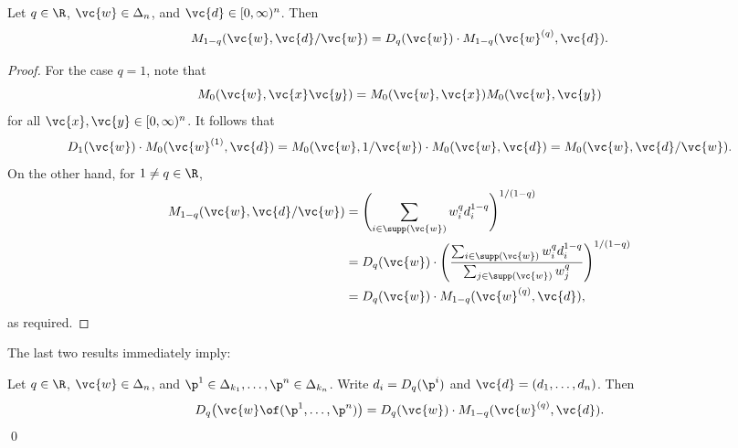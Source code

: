 \begin{lemma}
Let $q \in \R$, $\vc{w} \in \Delta_n$, and $\vc{d} \in [0, \infty)^n$.
Then
\[
M_{1 - q}(\vc{w}, \vc{d}/\vc{w})
=
D_q(\vc{w}) \cdot M_{1 - q}(\vc{w}^{(q)}, \vc{d}).
\]
\end{lemma}

\begin{proof}
For the case $q = 1$, note that
\[
M_0(\vc{w}, \vc{x}\vc{y}) =
M_0(\vc{w}, \vc{x}) M_0(\vc{w}, \vc{y})
\]
for all $\vc{x}, \vc{y} \in [0, \infty)^n$.  It follows that
\[
D_1(\vc{w}) \cdot M_0(\vc{w}^{(1)}, \vc{d})
=
M_0(\vc{w}, 1/\vc{w}) \cdot M_0(\vc{w}, \vc{d})
=
M_0(\vc{w}, \vc{d}/\vc{w}).
\]
On the other hand, for $1 \neq q \in \R$,
% 
\begin{align*}  
M_{1 - q}(\vc{w}, \vc{d}/\vc{w})        &
=
\Biggl( \sum_{i \in \supp(\vc{w})} w_i^q d_i^{1 - q} \Biggr)^{1/(1 - q)}\\
&
=
D_q(\vc{w}) \cdot
\Biggl( 
\frac{\sum_{i \in \supp(\vc{w})} w_i^q d_i^{1 - q}}%
{\sum_{j \in \supp(\vc{w})} w_j^q}
\Biggr)^{1/(1 - q)}       \\
&
=
D_q(\vc{w}) \cdot M_{1 - q}(\vc{w}^{(q)}, \vc{d}),
\end{align*}
% 
as required.
\end{proof}

The last two results immediately imply:

\begin{propn}
%
%
% 
Let $q \in \R$, $\vc{w} \in \Delta_n$, and $\p^1 \in
\Delta_{k_1}, \ldots, \p^n \in \Delta_{k_n}$.  Write $d_i = D_q(\p^i)$ and 
$\vc{d} = (d_1, \ldots, d_n)$.  Then
\[
D_q\bigl(\vc{w} \of (\p^1, \ldots, \p^n)\bigr)
=
D_q(\vc{w}) \cdot M_{1 - q}(\vc{w}^{(q)}, \vc{d}).
\]
\qed
\end{propn}

